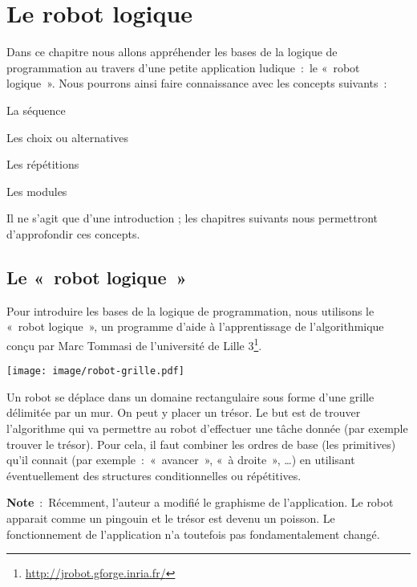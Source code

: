 \chapter{Le robot logique }

	Dans ce chapitre nous allons appréhender les bases de la logique de
	programmation au travers d’une petite application
	ludique~:~le «~robot logique~». Nous pourrons ainsi faire connaissance
	avec les concepts suivants~:
	
	\begin{liste}
	\item La séquence
	\item Les choix ou alternatives
	\item Les répétitions
	\item Les modules
	\end{liste}

	Il ne s’agit que d’une introduction ;
	les chapitres suivants nous permettront d’approfondir
	ces concepts.

\section{Le «~robot logique~»}

	Pour introduire les bases de la logique de programmation, nous utilisons
	le «~robot logique~», un programme d’aide à
	l’apprentissage de l’algorithmique conçu par Marc Tommasi
	de l’université de Lille
	3\footnote{\url{http://jrobot.gforge.inria.fr/}}.
	
	\begin{multicols}{2}
	\texttt{[image: image/robot-grille.pdf]}

	Un robot se déplace dans un domaine rectangulaire sous 
	forme d’une grille délimitée par un mur.
	On peut y placer un trésor. Le but est de trouver
	l’algorithme qui va permettre au robot
	d’effectuer une tâche donnée (par exemple trouver le
	trésor). Pour cela, il faut combiner les ordres de base (les
	primitives) qu’il connait (par exemple~:~«~avancer~»,
	«~à droite~», \dots) en utilisant éventuellement des structures
	conditionnelles ou répétitives.

	\end{multicols}
	
	\textbf{Note}~:~Récemment, l’auteur a modifié le graphisme de l’application.
	Le robot apparait comme un pingouin et le trésor est
	devenu un poisson. 
	Le fonctionnement de l’application n’a toutefois pas 
	fondamentalement changé.

